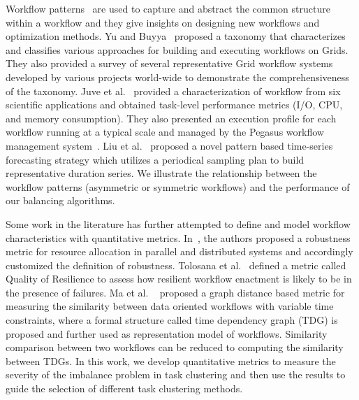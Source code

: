 Workflow patterns~\cite{Yu2005a, Juve2013, Liu2008} are used to capture and abstract the common structure within a workflow and they give insights on designing new workflows and optimization methods. Yu and Buyya~\cite{Yu2005a} proposed a taxonomy that characterizes and classifies various approaches for building and executing workflows on Grids. They also provided a survey of several representative Grid workflow systems developed by various projects world-wide to demonstrate the comprehensiveness of the taxonomy. Juve et al.~\cite{Juve2013} provided a characterization of workflow from six scientific applications and obtained task-level performance metrics (I/O, CPU, and memory consumption). They also presented an execution profile for each workflow running at a typical scale and managed by the Pegasus workflow management system~\cite{Deelman2004, Deelman:2005:PFM:1239649.1239653, deelman2014pegasus}. Liu et al.~\cite{Liu2008} proposed a novel pattern based time-series forecasting strategy which utilizes a periodical sampling plan to build representative duration series. We illustrate the relationship between the workflow patterns (asymmetric or symmetric workflows) and the performance of our balancing algorithms. 

Some work in the literature has further attempted to define and model workflow characteristics with quantitative metrics. In~\cite{Ali2004}, the authors proposed a robustness metric for resource allocation in parallel and distributed systems and accordingly customized the definition of robustness. Tolosana et al.~\cite{Tolosana2011} defined a metric called Quality of Resilience to assess how resilient workflow enactment is likely to be in the presence of failures. Ma et al. ~\cite{Ma:2014:GDB:2560969.2561388} proposed a graph distance based metric for measuring the similarity between data oriented workflows with variable time constraints, where a formal structure called time dependency graph (TDG) is proposed and further used as representation model of workflows. Similarity comparison between two workflows can be reduced to computing the similarity between TDGs. In this work, we develop quantitative metrics to measure the severity of the imbalance problem in task clustering and then use the results to guide the selection of different task clustering methods.


